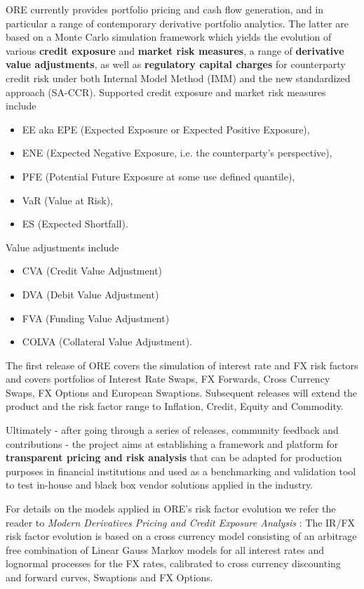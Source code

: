 \documentclass[12pt, a4paper]{article}
\begin{document}
ORE currently provides portfolio pricing and cash flow generation, and in particular a range of contemporary derivative portfolio analytics. The latter are based on a Monte Carlo simulation framework which yields the evolution of various {\bf credit exposure} and {\bf market risk measures}, a range of {\bf derivative value adjustments}, as well as {\bf regulatory capital charges} for counterparty credit risk under both Internal Model Method (IMM) and the new standardized approach (SA-CCR). Supported credit exposure and market risk measures include
\begin{itemize}
\item EE aka EPE (Expected Exposure or Expected Positive Exposure), 
\item ENE (Expected Negative Exposure, i.e. the counterparty's perspective), 
\item PFE (Potential Future Exposure at some use defined quantile), 
\item VaR (Value at Risk),
\item ES (Expected Shortfall).
\end{itemize}
Value adjustments include 
\begin{itemize}
\item CVA (Credit Value Adjustment)
\item DVA (Debit Value Adjustment)
\item FVA (Funding Value Adjustment)
\item COLVA (Collateral Value Adjustment).
\end{itemize}

\medskip
The first release of ORE covers the simulation of interest rate and FX risk factors and covers portfolios of Interest Rate Swaps, FX Forwards, Cross Currency Swaps, FX Options and European Swaptions. Subsequent releases will extend the product and the risk factor range to Inflation, Credit, Equity and Commodity.     

\medskip
Ultimately - after going through a series of releases, community feedback and contributions - the project aims at establishing a framework and platform for {\bf transparent pricing and risk analysis} that can be adapted for production purposes in financial institutions and used as a benchmarking and validation tool to test in-house and black box vendor solutions applied in the industry. 

\medskip
For details on the models applied in ORE's risk factor evolution we refer the reader to {\em Modern Derivatives Pricing and Credit Exposure Analysis} \cite{Lichters}: The IR/FX risk factor evolution is based on a cross currency model consisting of an arbitrage free combination of Linear Gauss Markov models for all interest rates and lognormal processes for the FX rates, calibrated to cross currency discounting and forward curves, Swaptions and FX Options.%
 
\end{document}
